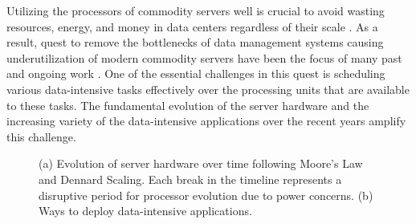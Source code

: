 \documentclass[11pt,dvipdfm]{article}
\begin{document}
Utilizing the processors of commodity servers well is crucial to avoid wasting
resources, energy, and money in data centers regardless of their scale \cite{Hamilton10}.
As a result, quest to remove the bottlenecks of data management systems causing underutilization
of modern commodity servers have been the focus of many past and ongoing work \cite{AilamakiLTPP17}.
One of the essential challenges in this quest is scheduling various data-intensive tasks
effectively over the processing units that are available to these tasks. 
The fundamental evolution of the server hardware and the increasing variety
of the data-intensive applications over the recent years amplify this challenge.

\begin{figure}
\hfill
{}
\caption{(a) Evolution of server hardware over time following Moore’s Law and Dennard Scaling.
Each break in the timeline represents a disruptive period for processor evolution due to power concerns.
(b) Ways to deploy data-intensive applications.}
\label{fig:hwdia}
\end{figure}
\end{document}
